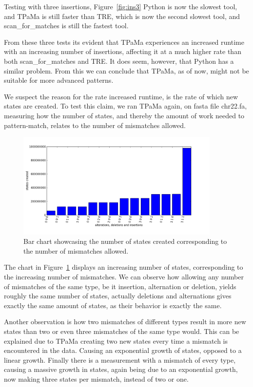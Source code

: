 Testing with three insertions, Figure~\ref{fig:ins3} Python is now the slowest tool, and TPaMa is still faster than TRE, which is now the second slowest tool, and scan\_for\_matches is still the fastest tool.

From these three tests its evident that TPaMa experiences an increased runtime with an increasing number of insertions, affecting it at a much higher rate than both scan\_for\_matches and TRE. It does seem, however, that Python has a similar problem. From this we can conclude that TPaMa, as of now, might not be suitable for more advanced patterns.

We suspect the reason for the rate increased runtime, is the rate of which new states are created. To test this claim, we ran TPaMa again, on fasta file chr22.fa, measuring how the number of states, and thereby the amount of work needed to pattern-match, relates to the number of mismatches allowed.

\begin{figure}[h!]
\centering
\includegraphics[width=0.9\textwidth]{Benchmarking/states_graph.png}
\caption{Bar chart showcasing the number of states created corresponding to the number of mismatches allowed.}
\label{fig:statesgraph}
\end{figure}

The chart in Figure~\ref{fig:statesgraph} displays an increasing number of states, corresponding to the increasing number of mismatches. We can observe how allowing any number of mismatches of the same type, be it insertion, alternation or deletion, yields roughly the same number of states, actually deletions and alternations gives exactly the same amount of states, as their behavior is exactly the same.

Another observation is how two mismatches of different types result in more new states than two or even three mismatches of the same type would. This can be explained due to TPaMa creating two new states every time a mismatch is encountered in the data. Causing an exponential growth of states, opposed to a linear growth. Finally there is a measurement with a mismatch of every type, causing a massive growth in states, again being due to an exponential growth, now making three states per mismatch, instead of two or one.  

